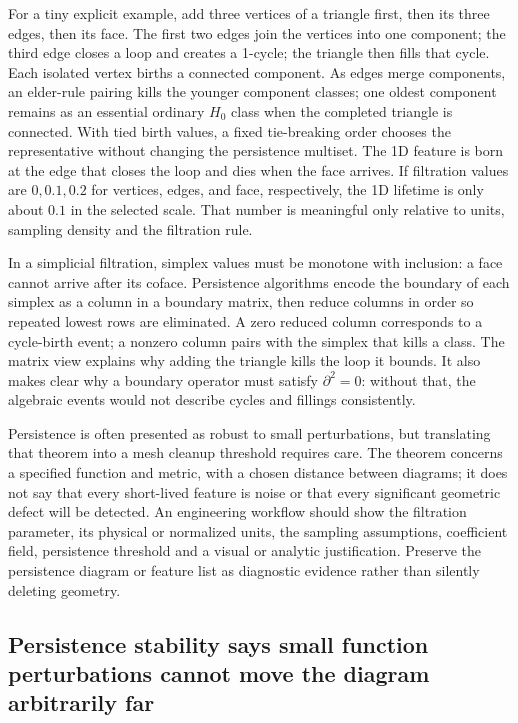 For a tiny explicit example, add three vertices of a triangle first, then its three edges, then its face. The first two edges join the vertices into one component; the third edge closes a loop and creates a 1-cycle; the triangle then fills that cycle. Each isolated vertex births a connected component. As edges merge components, an elder-rule pairing kills the younger component classes; one oldest component remains as an essential ordinary \(H_0\) class when the completed triangle is connected. With tied birth values, a fixed tie-breaking order chooses the representative without changing the persistence multiset. The 1D feature is born at the edge that closes the loop and dies when the face arrives. If filtration values are \(0,0.1,0.2\) for vertices, edges, and face, respectively, the 1D lifetime is only about \(0.1\) in the selected scale. That number is meaningful only relative to units, sampling density and the filtration rule.

In a simplicial filtration, simplex values must be monotone with inclusion: a face cannot arrive after its coface. Persistence algorithms encode the boundary of each simplex as a column in a boundary matrix, then reduce columns in order so repeated lowest rows are eliminated. A zero reduced column corresponds to a cycle-birth event; a nonzero column pairs with the simplex that kills a class. The matrix view explains why adding the triangle kills the loop it bounds. It also makes clear why a boundary operator must satisfy \(\partial^2=0\): without that, the algebraic events would not describe cycles and fillings consistently.

Persistence is often presented as robust to small perturbations, but translating that theorem into a mesh cleanup threshold requires care. The theorem concerns a specified function and metric, with a chosen distance between diagrams; it does not say that every short-lived feature is noise or that every significant geometric defect will be detected. An engineering workflow should show the filtration parameter, its physical or normalized units, the sampling assumptions, coefficient field, persistence threshold and a visual or analytic justification. Preserve the persistence diagram or feature list as diagnostic evidence rather than silently deleting geometry.

\subsection{Persistence stability says small function perturbations cannot move the diagram arbitrarily far}\label{03-visual-computing-i-ch002-persistence-stability-says-small-function-perturbations-cannot-move-the-diagram-arbitrarily-far}

